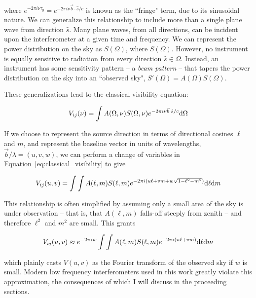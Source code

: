 where $e^{-2\pi i \nu \tau_g} = e^{-2\pi i \nu \vec{b}\cdot\hat{s}/c}$ is known as the ``fringe" term, due to its sinusoidal nature. We can generalize this relationship to include more than a single plane wave from direction $\hat{s}$. Many plane waves, from all directions, can be incident upon the interferometer at a given time and frequency. We can represent the power distribution on the sky as $S(\Omega)$, where $S(\Omega)$. However, no instrument is equally sensitive to radiation from every direction $\hat{s} \in \Omega$. Instead, an instrument has some sensitivity pattern -- a \textit{beam pattern} -- that tapers the power distribution on the sky into an ``observed sky",  $S'(\Omega) = A(\Omega)S(\Omega)$. 

These generalizations lead to the classical visibility equation:

\begin{equation}
V_{ij}(\nu) = \int A(\Omega, \nu) S(\Omega, \nu) e^{-2\pi i \nu \vec{b}\cdot\hat{s}/c} {\rm d}\Omega
\label{eq:classical_visibility}
\end{equation}

If we choose to represent the source direction in terms of directional cosines $\ell$ and $m$, and represent the baseline vector in units of wavelengths, $\vec{b}/\lambda=(u,v,w)$, we can perform a change of variables in Equation~\ref{eq:classical_visibility} to give

\begin{equation}
V_{ij}(u,v) = \int\int A(\ell, m)S(\ell, m) e^{-2\pi i (u\ell + vm + w\sqrt{1 - \ell^2 - m^2})} {\rm d}\ell {\rm d}m
\end{equation}

This relationship is often simplified by assuming only a small area of the sky is under observation -- that is, that $A(\ell,m)$ falls-off steeply from zenith -- and therefore $\ell^2$ and $m^2$ are small. This grants

\begin{equation}
V_{ij}(u,v) \approx e^{-2\pi i w} \int\int A(\ell, m)S(\ell, m) e^{-2\pi i (u\ell + vm)} {\rm d}\ell {\rm d}m
\end{equation}

which plainly casts $V(u,v)$ as the Fourier transform of the observed sky if $w$ is small. Modern low frequency interferometers used in this work greatly violate this approximation, the consequences of which I will discuss in the proceeding sections.


